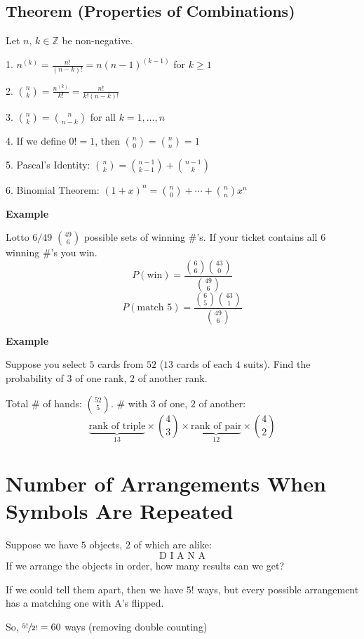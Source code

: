 \begin{thmbox}
    \subsection{Theorem (Properties of Combinations)}
    Let $ n,\,k\in \mathbb{Z} $ be non-negative.

    1. $ n^{(k)}=\frac{n!}{(n-k)!}=n(n-1)^{(k-1)} $ for $ k\ge 1 $

    2. $ \binom{n}{k}=\frac{n^{(k)}}{k!}=\frac{n!}{k!(n-k)!} $

    3. $\binom{n}{k}=\binom{n}{n-k}$ for all $ k=1,\ldots,n $

    4. If we define $ 0!=1 $, then $\binom{n}{0}=\binom{n}{n}=1$

    5. Pascal's Identity: $\binom{n}{k}=\binom{n-1}{k-1}+\binom{n-1}{k}$

    6. Binomial Theorem: $ (1+x)^n=\binom{n}{0}+\cdots +\binom{n}{n}x^n $
\end{thmbox}

\textbf{Example}

Lotto $ 6/49 $ $ \binom{49}{6} $ possible sets of winning \#'s. If your
ticket contains all $ 6 $ winning \#'s you win.
\[ P(\text{win})=\frac{\binom{6}{6}\binom{43}{0}}{\binom{49}{6}} \]
\[ P(\text{match }5)=\frac{\binom{6}{5}\binom{43}{1}}{\binom{49}{6}} \]

\textbf{Example}

Suppose you select $ 5 $ cards from $ 52 $ ($ 13 $ cards of each $ 4 $ suits).
Find the probability of $ 3 $ of one rank, $ 2 $ of another rank.

Total \# of hands: $ \binom{52}{5} $.
\# with $ 3 $ of one, $2$ of another:
\[ \underbrace{\text{rank of triple}}_{13}\times \binom{4}{3}\times
    \underbrace{\text{rank of pair}}_{12}\times \binom{4}{2} \]

\section{Number of Arrangements When Symbols Are Repeated}

Suppose we have $ 5 $ objects, $ 2 $ of which are alike:
\[ \text{D I A N A} \]
If we arrange the objects in order, how many results can we get?

If we could tell them apart, then we have $ 5! $ ways,
but every possible arrangement has a matching one with A's flipped.

So, $ \sfrac{5!}{2!} =60 $ ways (removing double counting)

